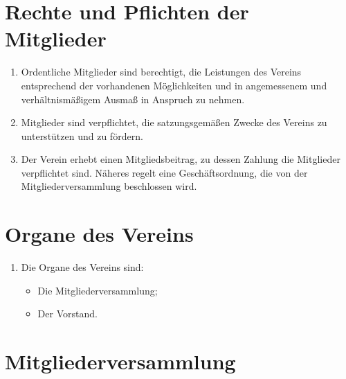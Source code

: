 \documentclass[fontsize=12pt,paper=a4,pagesize,headings=small]{scrartcl}
\begin{document}
\section{Rechte und Pflichten der Mitglieder}

\begin{enumerate}
	\item Ordentliche Mitglieder sind berechtigt, die Leistungen des
		Vereins entsprechend der vorhandenen Möglichkeiten und in angemessenem
		und verhältnismäßigem Ausmaß in Anspruch zu nehmen.

	\item Mitglieder sind verpflichtet, die satzungsgemäßen Zwecke des
		Vereins zu unterstützen und zu fördern.

	\item Der Verein erhebt einen Mitgliedsbeitrag, zu dessen Zahlung die
		Mitglieder verpflichtet sind. Näheres regelt eine Geschäftsordnung,
		die von der Mitgliederversammlung beschlossen wird.

\end{enumerate}

\section{Organe des Vereins}

\begin{enumerate}
	\item Die Organe des Vereins sind:
		\begin{itemize}
			\item Die Mitgliederversammlung;
			\item Der Vorstand.
		\end{itemize}
\end{enumerate}

\section{Mitgliederversammlung}
\end{document}
